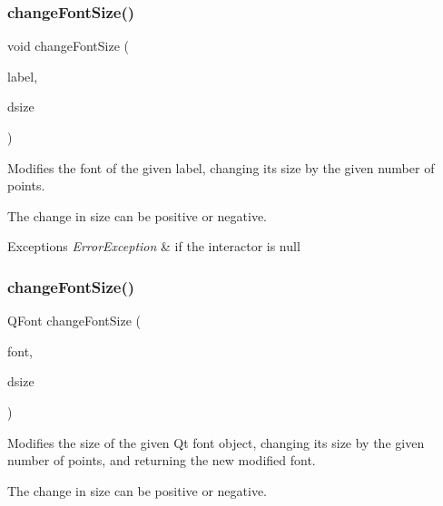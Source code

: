 \subsubsection{\texorpdfstring{change\+Font\+Size()}{changeFontSize()}\hspace{0.1cm}{\footnotesize\ttfamily [2/3]}}
{\footnotesize\ttfamily void change\+Font\+Size (\begin{DoxyParamCaption}\item[{\mbox{\hyperlink{classGText}{G\+Text}} $\ast$}]{label,  }\item[{int}]{dsize }\end{DoxyParamCaption})\hspace{0.3cm}{\ttfamily [static]}}



Modifies the font of the given label, changing its size by the given number of points. 

The change in size can be positive or negative. 
\begin{DoxyExceptions}{Exceptions}
{\em Error\+Exception} & if the interactor is null \\
\hline
\end{DoxyExceptions}
\mbox{\label{classGFont_a1f55c64940d99e62528d5bfc634123f8}} 
\subsubsection{\texorpdfstring{change\+Font\+Size()}{changeFontSize()}\hspace{0.1cm}{\footnotesize\ttfamily [3/3]}}
{\footnotesize\ttfamily Q\+Font change\+Font\+Size (\begin{DoxyParamCaption}\item[{const Q\+Font \&}]{font,  }\item[{int}]{dsize }\end{DoxyParamCaption})\hspace{0.3cm}{\ttfamily [static]}}



Modifies the size of the given Qt font object, changing its size by the given number of points, and returning the new modified font. 

The change in size can be positive or negative. \mbox{\label{classGFont_ac36fbf8f4ebf4558559f98d54277529f}} 

